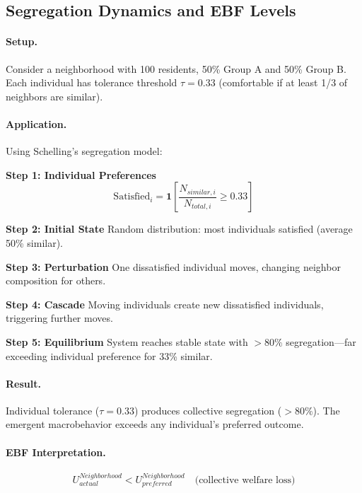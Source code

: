\subsection{Segregation Dynamics and EBF Levels}

\paragraph{Setup.} Consider a neighborhood with 100 residents, 50\% Group A
and 50\% Group B. Each individual has tolerance threshold $\tau = 0.33$
(comfortable if at least 1/3 of neighbors are similar).

\paragraph{Application.} Using Schelling's segregation model:

\textbf{Step 1: Individual Preferences}
\begin{equation}
\text{Satisfied}_i = \mathbf{1}\left[\frac{N_{similar,i}}{N_{total,i}} \geq 0.33\right]
\end{equation}

\textbf{Step 2: Initial State}
Random distribution: most individuals satisfied (average 50\% similar).

\textbf{Step 3: Perturbation}
One dissatisfied individual moves, changing neighbor composition for others.

\textbf{Step 4: Cascade}
Moving individuals create new dissatisfied individuals, triggering further moves.

\textbf{Step 5: Equilibrium}
System reaches stable state with $>80\%$ segregation---far exceeding individual
preference for 33\% similar.

\paragraph{Result.} Individual tolerance ($\tau = 0.33$) produces collective
segregation ($>80\%$). The emergent macrobehavior exceeds any individual's
preferred outcome.

\paragraph{EBF Interpretation.}
\begin{equation}
U^{Neighborhood}_{actual} < U^{Neighborhood}_{preferred} \quad \text{(collective welfare loss)}
\end{equation}

